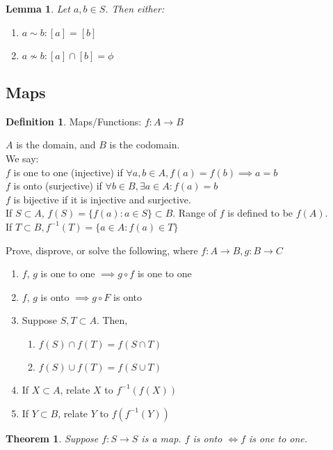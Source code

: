 \documentclass{article}
\theoremstyle{definition}
\newtheorem{definition}{Definition}
\theoremstyle{plain}
\newtheorem{theorem}{Theorem}
\theoremstyle{corollary}
\theoremstyle{lemma}
\newtheorem{lemma}{Lemma}
\begin{document}
\begin{lemma}
Let $a,b\in S$. Then either:
\begin{enumerate}
    \item $a\sim b: [a]=[b]$
    \item $a\nsim b: [a]\cap[b]=\phi$
\end{enumerate}
\end{lemma}

\subsection{Maps}

\begin{definition}
Maps/Functions: $f:A\rightarrow B$
\end{definition}

$A$ is the domain, and $B$ is the codomain.\\
We say:\\
$f$ is one to one (injective) if $\forall a,b\in A,f(a)=f(b)\implies a=b$\\
$f$ is onto (surjective) if $\forall b\in B,\exists a\in A:f(a)=b$\\
$f$ is bijective if it is injective and surjective.\\
If $S\subset A$, $f(S)=\{f(a):a\in S\}\subset B$. Range of $f$ is defined to be $f(A)$.\\
If $T\subset B,f^{-1}(T)=\{a\in A:f(a)\in T\}$

Prove, disprove, or solve the following, where $f:A\rightarrow B, g:B\rightarrow C$
\begin{enumerate}
    \item $f$, $g$ is one to one $\implies g\circ f$ is one to one
    \item $f$, $g$ is onto $\implies g\circ F$ is onto
    \item Suppose $S,T\subset A$. Then,
    \begin{enumerate}
        \item $f(S)\cap f(T)=f(S\cap T)$
        \item $f(S)\cup f(T)=f(S\cup T)$
    \end{enumerate}
    \item If $X\subset A$, relate $X$ to $f^{-1}(f(X))$
    \item If $Y\subset B$, relate $Y$ to $f(f^{-1}(Y))$
\end{enumerate}

\begin{theorem}
Suppose $f:S\rightarrow S$ is a map. $f$ is onto $\iff f$ is one to one.
\end{theorem}
\end{document}
